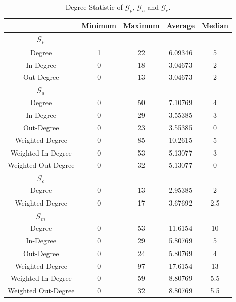 \documentclass[11pt,a4paper]{book}
\theoremstyle{definition}
\theoremstyle{definition}
\theoremstyle{definition}
\theoremstyle{remark}
\newcommand{\pgraph}{\mathcal{G}_{p}}
\newcommand{\agraph}{\mathcal{G}_{a}}
\newcommand{\cgraph}{\mathcal{G}_{c}}
\newcommand{\acgraph}{\mathcal{G}_{m}}
\begin{document}
\begin{center}
\begin{table}
\small
\centering
\begin{tabular}{c| c c c c }
\toprule
{} &  Minimum &  Maximum &  Average &  Median \\
\midrule
\midrule
$\pgraph$ \\
\midrule
Degree & 1 & 22 & 6.09346 & 5 \\
In-Degree &  0 &   18 & 3.04673 & 2 \\
Out-Degree &  0 &   13 & 3.04673 & 2 \\
\midrule
$\agraph$ \\
\midrule
Degree & 0 & 50 & 7.10769 &  4 \\
In-Degree &  0 &   29 & 3.55385 & 3 \\
Out-Degree &  0 &   23 & 3.55385  &  0 \\
Weighted Degree & 0 & 85 & 10.2615 &  5 \\
Weighted In-Degree &  0 &   53 & 5.13077 & 3 \\
Weighted Out-Degree &  0 &    32 & 5.13077 &  0 \\
\midrule
$\cgraph$ \\
\midrule
 Degree & 0 & 13 & 2.95385& 2 \\
Weighted Degree & 0 & 17 & 3.67692 & 2.5 \\
\midrule
$\acgraph$ \\
\midrule
Degree & 0 & 53 & 11.6154 &  10 \\
In-Degree &  0 &   29 & 5.80769 & 5 \\
Out-Degree &  0 &   24 &  5.80769  &  4 \\
Weighted Degree & 0 & 97 & 17.6154 &  13 \\
Weighted In-Degree &  0 &   59 & 8.80769&  5.5 \\
Weighted Out-Degree &  0 &    32 & 8.80769 &   5.5 \\
\bottomrule
\end{tabular}
\caption{Degree Statistic of $\pgraph$, $\agraph$ and $\cgraph$.}
\label{tab:pgraph-degree_stat}
\end{table}
\end{center}


\clearpage
\end{document}
